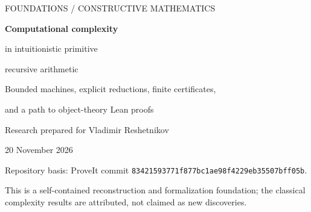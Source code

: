 \documentclass[11pt,letterpaper]{article}
\theoremstyle{definition}
\newcommand{\ipra}{\ensuremath{\mathsf{iPRA}}}
\newcommand{\code}[1]{\texttt{\small #1}}
\begin{document}
\hypersetup{pageanchor=false}
\begin{titlepage}
\vspace*{0.45in}
{\small\sffamily FOUNDATIONS / CONSTRUCTIVE MATHEMATICS}\par
\vspace{0.35in}
{\Huge\bfseries Computational complexity\par in intuitionistic primitive\par recursive arithmetic\par}
\vspace{0.3in}
{\Large Bounded machines, explicit reductions, finite certificates,\par and a path to object-theory Lean proofs}\par
\vspace{0.45in}
{\large Research prepared for Vladimir Reshetnikov}\par
{\large 20 November 2026}\par
\vspace{0.45in}
\begin{abstract}
We develop a first-order, constructive foundation for complexity theory over
intuitionistic primitive recursive arithmetic. Binary words, machines, clocks,
finite computation histories, witnesses, circuits, and graphs are natural-number
codes. All inductions are reduced to quantifier-free induction by explicit
Boolean compilation of bounded invariants. Separate bit-machine cost proofs
prevent primitive-recursive definability from being mistaken for feasibility.

The development includes clocked presentations of the basic time and space
classes, polynomial reductions, witness-preserving Cook--Levin completeness,
constructive finite graph algorithms, Savitch simulation, nondeterministic
space complementation, quantified Boolean formula completeness, and a direct
diagonal language in exponential time with an explicit counterexample to every
polynomial descriptor. Further finite developments cover circuit counting,
randomized computation and amplification, counting witnesses, and the
polynomial hierarchy. The archive contains a kernel-checked Lean semantic
core, executable reference algorithms, and a detailed plan for lowering the
main results to the repository's actual \code{Prf PRAAx} judgment.

\textbf{Verification boundary.} The mathematical arguments are developed here;
the complete object-language \ipra{} derivations of Cook--Levin, Savitch,
space complementation, and the separation theorem have not been mechanically
constructed in this package. Checked Lean lemmas and remaining obligations
are identified separately.
\end{abstract}
\vfill
\noindent\small Repository basis: ProveIt commit
\texttt{83421593771f877bc1ae98f4229eb35507bff05b}.\par
\noindent\small This is a self-contained reconstruction and formalization foundation;
the classical complexity results are attributed, not claimed as new discoveries.
\end{titlepage}
\hypersetup{pageanchor=true}
\tableofcontents
\clearpage
{}









\end{document}

